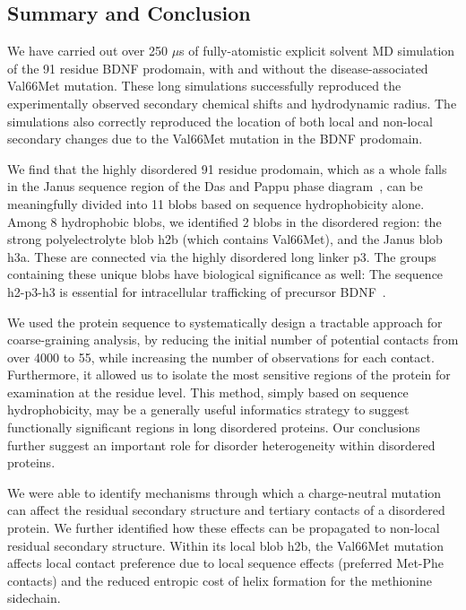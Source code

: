\documentclass[10pt,letterpaper]{article}
\begin{document}
\subsection*{Summary and Conclusion}

We have carried out over 250 $\mu$s of fully-atomistic explicit solvent MD simulation of the 91 residue BDNF prodomain, with and without the disease-associated Val66Met mutation. These long simulations successfully reproduced the experimentally observed secondary chemical shifts and hydrodynamic radius. The simulations also correctly reproduced the location of both local and non-local secondary changes due to the Val66Met mutation in the BDNF prodomain. 

We find that the highly disordered 91 residue prodomain, which as a whole falls in the Janus sequence region of the Das and Pappu phase diagram~\cite{Das2013}, can be meaningfully divided into 11 blobs based on sequence hydrophobicity alone. Among 8 hydrophobic blobs, we identified 2 blobs in the disordered region: the strong polyelectrolyte blob h2b (which contains Val66Met), and the Janus blob h3a. These are connected via the highly disordered long linker p3. The groups containing these unique blobs have biological significance as well: The sequence h2-p3-h3 is essential for intracellular trafficking of precursor BDNF~\cite{Chen2005}. 

We used the protein sequence to systematically design a tractable approach for coarse-graining analysis, by reducing the initial number of potential contacts from over 4000 to 55, while increasing the number of observations for each contact. Furthermore, it allowed us to isolate the most sensitive regions of the protein for examination at the residue level. This method, simply based on sequence hydrophobicity, may be a generally useful informatics strategy to suggest functionally significant regions in long disordered proteins. Our conclusions further suggest an important role for disorder heterogeneity within disordered proteins. 

We were able to identify mechanisms through which a charge-neutral mutation can affect the residual secondary structure and tertiary contacts of a disordered protein. We further identified how these effects can be propagated to non-local residual secondary structure. Within its local blob h2b, the Val66Met mutation affects local contact preference due to local sequence effects (preferred Met-Phe contacts) and the reduced entropic cost of helix formation for the methionine sidechain.
\end{document}
